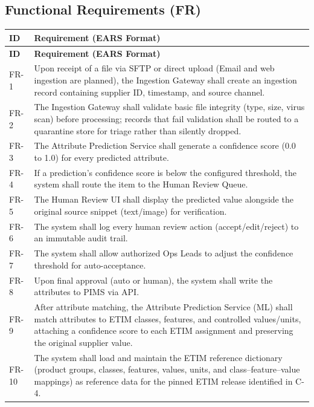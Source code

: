 \documentclass[12pt, a4paper]{article}
\begin{document}
\subsection{Functional Requirements (FR)}
\begin{longtable}{@{}l >{\raggedright\arraybackslash}p{14cm}@{}}
\toprule
\textbf{ID} & \textbf{Requirement (EARS Format)} \\
\midrule
\endfirsthead
\toprule
\textbf{ID} & \textbf{Requirement (EARS Format)} \\
\midrule
\endhead
\bottomrule
\endfoot
\bottomrule
\endlastfoot
FR-1 & Upon receipt of a file via SFTP or direct upload (Email and web ingestion are planned), the Ingestion Gateway shall create an ingestion record containing supplier ID, timestamp, and source channel. \\
\addlinespace
FR-2 & The Ingestion Gateway shall validate basic file integrity (type, size, virus scan) before processing; records that fail validation shall be routed to a quarantine store for triage rather than silently dropped. \\
\addlinespace
FR-3 & The Attribute Prediction Service shall generate a confidence score (0.0 to 1.0) for every predicted attribute. \\
\addlinespace
FR-4 & If a prediction's confidence score is below the configured threshold, the system shall route the item to the Human Review Queue. \\
\addlinespace
FR-5 & The Human Review UI shall display the predicted value alongside the original source snippet (text/image) for verification. \\
\addlinespace
FR-6 & The system shall log every human review action (accept/edit/reject) to an immutable audit trail. \\
\addlinespace
FR-7 & The system shall allow authorized Ops Leads to adjust the confidence threshold for auto-acceptance. \\
\addlinespace
FR-8 & Upon final approval (auto or human), the system shall write the attributes to PIMS via API. \\
\addlinespace
FR-9 & After attribute matching, the Attribute Prediction Service (ML) shall match attributes to ETIM classes, features, and controlled values/units, attaching a confidence score to each ETIM assignment and preserving the original supplier value. \\
\addlinespace
FR-10 & The system shall load and maintain the ETIM reference dictionary (product groups, classes, features, values, units, and class--feature--value mappings) as reference data for the pinned ETIM release identified in C-4. \\
\end{longtable}
\end{document}
